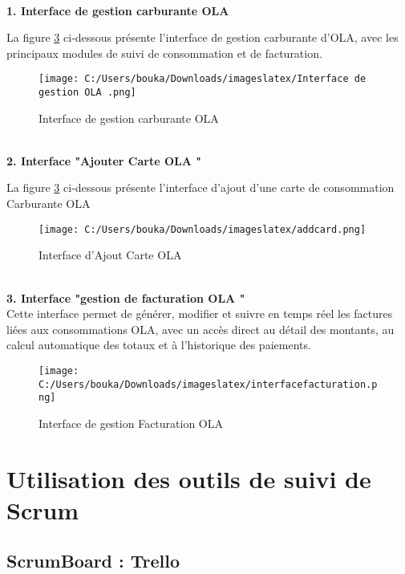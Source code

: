 \documentclass[a4paper,11pt]{report}
\begin{document}
\textbf{      \\ 1. Interface de gestion carburante OLA}

La figure \ref{fig:clone-result} ci-dessous présente l’interface de gestion carburante d’OLA, avec les principaux modules de suivi de consommation et de facturation.

\begin{figure}[H]
  \centering
  \texttt{[image: C:/Users/bouka/Downloads/imageslatex/Interface de gestion OLA .png]}
  \caption{Interface de gestion carburante OLA}
  \label{fig:clone-result}
\end{figure}




\textbf{      \\ 2. Interface  "Ajouter Carte OLA "}

La figure \ref{fig:clone-result} ci-dessous présente l’interface d'ajout d'une carte de consommation Carburante OLA

\begin{figure}[H]
  \centering
  \texttt{[image: C:/Users/bouka/Downloads/imageslatex/addcard.png]}
  \caption{Interface d'Ajout Carte OLA}
  \label{fig:clone-result}
\end{figure}

\textbf{      \\ 3. Interface  "gestion de facturation OLA "}
\\
Cette interface permet de générer, modifier et suivre en temps réel les factures liées aux consommations OLA, avec un accès direct au détail des montants, au calcul automatique des totaux et à l’historique des paiements.
\begin{figure}[H]
  \centering
  \texttt{[image: C:/Users/bouka/Downloads/imageslatex/interfacefacturation.png]}
  \caption{Interface de gestion Facturation OLA}
  \label{fig:clone-result}
\end{figure}











\section{Utilisation des outils de suivi de Scrum}

\subsection{ScrumBoard : Trello}
\end{document}
